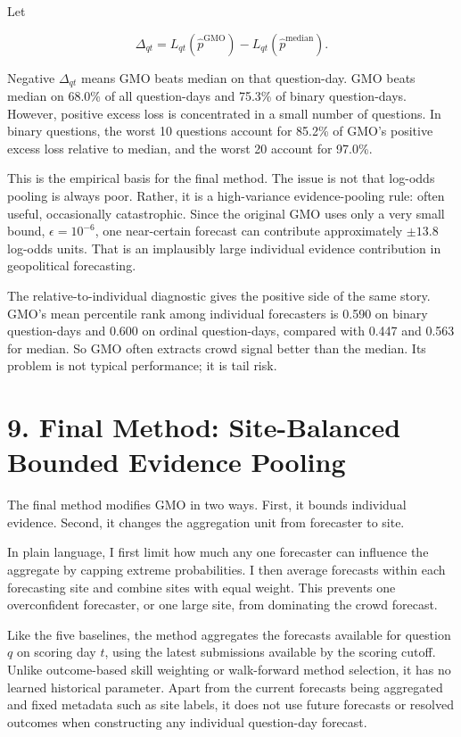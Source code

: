\documentclass[
]{article}
\begin{document}
Let

\[
\Delta_{qt}=L_{qt}(\hat p^{\mathrm{GMO}})-L_{qt}(\hat p^{\mathrm{median}}).
\]

Negative \(\Delta_{qt}\) means GMO beats median on that question-day.
GMO beats median on 68.0\% of all question-days and 75.3\% of binary
question-days. However, positive excess loss is concentrated in a small
number of questions. In binary questions, the worst 10 questions account
for 85.2\% of GMO's positive excess loss relative to median, and the
worst 20 account for 97.0\%.

This is the empirical basis for the final method. The issue is not that
log-odds pooling is always poor. Rather, it is a high-variance
evidence-pooling rule: often useful, occasionally catastrophic. Since
the original GMO uses only a very small bound, \(\epsilon=10^{-6}\), one
near-certain forecast can contribute approximately \(\pm 13.8\)
log-odds units. That is an implausibly large individual evidence
contribution in geopolitical forecasting.

The relative-to-individual diagnostic gives the positive side of the
same story. GMO's mean percentile rank among individual forecasters is
0.590 on binary question-days and 0.600 on ordinal question-days,
compared with 0.447 and 0.563 for median. So GMO often extracts crowd
signal better than the median. Its problem is not typical performance;
it is tail risk.

\section{9. Final Method: Site-Balanced Bounded Evidence
Pooling}\label{final-method-site-balanced-bounded-evidence-pooling}

The final method modifies GMO in two ways. First, it bounds individual
evidence. Second, it changes the aggregation unit from forecaster to
site.

In plain language, I first limit how much any one forecaster can
influence the aggregate by capping extreme probabilities. I then average
forecasts within each forecasting site and combine sites with equal
weight. This prevents one overconfident forecaster, or one large site,
from dominating the crowd forecast.

Like the five baselines, the method aggregates the forecasts available
for question \(q\) on scoring day \(t\), using the latest submissions
available by the scoring cutoff. Unlike outcome-based skill weighting or
walk-forward method selection, it has no learned historical parameter.
Apart from the current forecasts being aggregated and fixed metadata
such as site labels, it does not use future forecasts or resolved
outcomes when constructing any individual question-day forecast.
\end{document}
